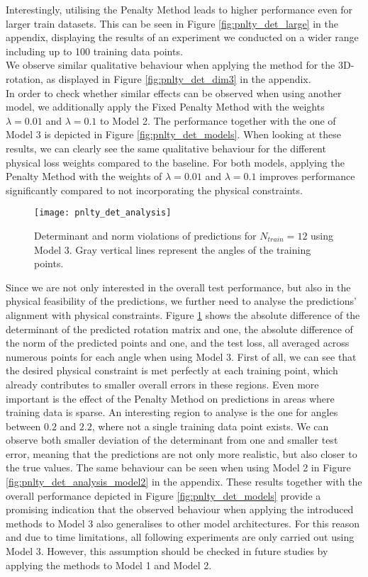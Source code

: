 \indent Interestingly, utilising the Penalty Method leads to higher performance even for larger train datasets. This can be seen in Figure \ref{fig:pnlty_det_large} in the appendix, displaying the results of an experiment we conducted on a wider range including up to 100 training data points.\\
We observe similar qualitative behaviour when applying the method for the 3D-rotation, as displayed in Figure \ref{fig:pnlty_det_dim3} in the appendix.\\
In order to check whether similar effects can be observed when using another model, we additionally apply the Fixed Penalty Method with the weights $\lambda = 0.01$ and $\lambda = 0.1$ to Model 2. The performance together with the one of Model 3 is depicted in Figure \ref{fig:pnlty_det_models}. When looking at these results, we can clearly see the same qualitative behaviour for the different physical loss weights compared to the baseline. For both models, applying the Penalty Method with the weights of $\lambda = 0.01$ and $\lambda = 0.1$ improves performance significantly compared to not incorporating the physical constraints. 
\begin{figure}[H]
	\centering
	\texttt{[image: pnlty\_det\_analysis]}
	\caption{Determinant and norm violations of predictions for $N_{train} = 12$ using Model 3. Gray vertical lines represent the angles of the training points.}
	\label{fig:pnlty_det_analysis}
\end{figure}
\indent Since we are not only interested in the overall test performance, but also in the physical feasibility of the predictions, we further need to analyse the predictions' alignment with physical constraints. Figure \ref{fig:pnlty_det_analysis} shows the absolute difference of the determinant of the predicted rotation matrix and one, the absolute difference of the norm of the predicted points and one, and the test loss, all averaged across numerous points for each angle when using Model 3. First of all, we can see that the desired physical constraint is met perfectly at each training point, which already contributes to smaller overall errors in these regions. Even more important is the effect of the Penalty Method on predictions in areas where training data is sparse. An interesting region to analyse is the one for angles between $0.2$ and $2.2$, where not a single training data point exists. We can observe both smaller deviation of the determinant from one and smaller test error, meaning that the predictions are not only more realistic, but also closer to the true values. The same behaviour can be seen when using Model 2 in Figure \ref{fig:pnlty_det_analysis_model2} in the appendix. These results together with the overall performance depicted in Figure \ref{fig:pnlty_det_models} provide a promising indication that the observed behaviour when applying the introduced methods to Model 3 also generalises to other model architectures. For this reason and due to time limitations, all following experiments are only carried out using Model 3. However, this assumption should be checked in future studies by applying the methods to Model 1 and Model 2.

